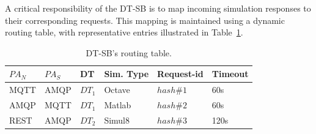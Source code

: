 A critical responsibility of the DT-SB is to map incoming simulation responses to their corresponding requests. This mapping is maintained using a dynamic routing table, with representative entries illustrated in Table~\ref{tab:index-table}. 

\begin{table}[h]
    \centering
    \caption{DT-SB's routing table.}
    \label{tab:index-table}
    \renewcommand{\arraystretch}{1.5}  %
    \begin{tabular}{p{0.5in}llp{0.5in}lp{0.5in}}
    \hline
    \textbf{$PA_N$} & \textbf{$PA_S$} & \textbf{DT} & \textbf{Sim. Type} & \textbf{Request-id} & \textbf{Timeout}\\
    \hline
    MQTT & AMQP & $DT_1$ & Octave & $hash\#1$ & 60s\\
    AMQP & MQTT & $DT_1$ & Matlab & $hash\#2$ & 60s\\
    REST & AMQP & $DT_2$ & Simul8 & $hash\#3$ & 120s\\
    \hline
    \end{tabular}
\end{table}


